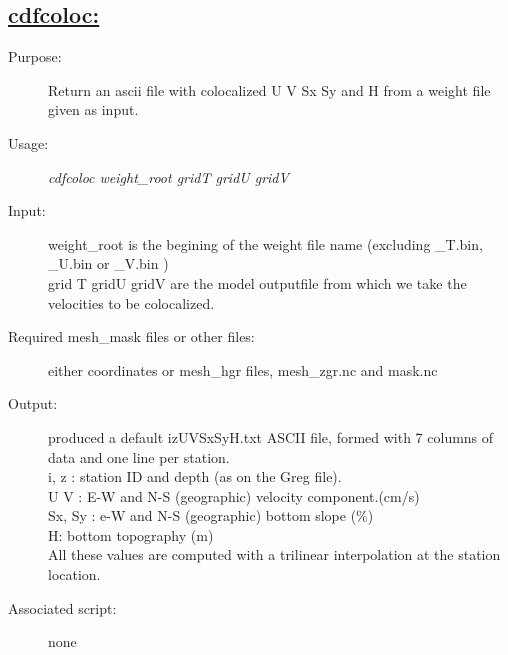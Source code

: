 \documentclass[a4paper,11pt]{article}
\begin{document}
\subsection*{\underline{cdfcoloc:}}
\begin{description}
\item[Purpose:] Return an ascii file with colocalized U V Sx Sy and H from a weight file given as input.
\item[Usage:] {\em cdfcoloc weight\_root gridT gridU gridV }
\item[Input:] weight\_root is the begining of the weight file name (excluding \_T.bin, \_U.bin or \_V.bin ) \\
      grid T gridU gridV are the model outputfile from   which we take the velocities to be colocalized.
\item[Required mesh\_mask files or other files:] either coordinates or mesh\_hgr files, mesh\_zgr.nc and mask.nc
\item[Output:] produced a default izUVSxSyH.txt ASCII file, formed with 7 columns of data and one line per station. \\
          i, z : station ID and depth (as on the Greg file). \\
          U V : E-W and N-S (geographic) velocity component.(cm/s) \\
          Sx, Sy : e-W and N-S (geographic) bottom slope (\%)\\
          H: bottom topography (m) \\
         All these values are computed with a trilinear interpolation at the station location.
\item[Associated script:] none
\end{description}

\newpage
\end{document}
